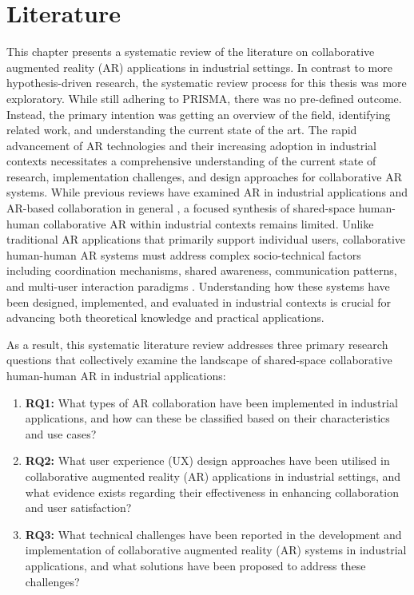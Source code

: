 \chapter{Literature}\label{chapter:literature}

This chapter presents a systematic review of the literature on collaborative augmented reality (AR) applications in industrial settings. In contrast to more hypothesis-driven research, the systematic review process for this thesis was more exploratory. While still adhering to PRISMA, there was no pre-defined outcome. Instead, the primary intention was getting an overview of the field, identifying related work, and understanding the current state of the art. The rapid advancement of AR technologies and their increasing adoption in industrial contexts necessitates a comprehensive understanding of the current state of research, implementation challenges, and design approaches for collaborative AR systems. While previous reviews have examined AR in industrial applications \cite{deSouza2020surveyIndustrialAR} and AR-based collaboration in general \cite{Lukosch2015Collaboration}, a focused synthesis of shared-space human-human collaborative AR within industrial contexts remains limited. Unlike traditional AR applications that primarily support individual users, collaborative human-human AR systems must address complex socio-technical factors including coordination mechanisms, shared awareness, communication patterns, and multi-user interaction paradigms \cite{feng2023comprehensive}. Understanding how these systems have been designed, implemented, and evaluated in industrial contexts is crucial for advancing both theoretical knowledge and practical applications.

As a result, this systematic literature review addresses three primary research questions that collectively examine the landscape of shared-space collaborative human-human AR in industrial applications:

\begin{enumerate}
    \item \textbf{RQ1:} What types of AR collaboration have been implemented in industrial applications, and how can these be classified based on their characteristics and use cases?
    \item \textbf{RQ2:} What user experience (UX) design approaches have been utilised in collaborative augmented reality (AR) applications in industrial settings, and what evidence exists regarding their effectiveness in enhancing collaboration and user satisfaction?
    \item \textbf{RQ3:} What technical challenges have been reported in the development and implementation of collaborative augmented reality (AR) systems in industrial applications, and what solutions have been proposed to address these challenges?
\end{enumerate}

